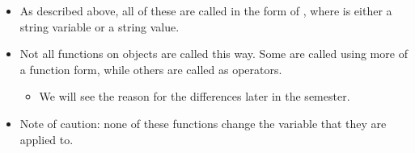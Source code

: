 \documentclass[letterpaper,10pt,english]{sphinxmanual}
\begin{document}
\begin{itemize}
\begin{sphinxVerbatim}[commandchars=\\\{\}]
\end{sphinxVerbatim}

\item {} 
As described above, all of these are called in the form of
, where  is either a string
variable or a string value.

\item {} 
Not all functions on objects are called this way. Some are called
using more of a function form, while others are called as
operators.

%
\begin{sphinxVerbatim}[commandchars=\\\{\}]
  
  
\end{sphinxVerbatim}
\begin{itemize}
\item {} 
We will see the reason for the differences later in the semester.

\end{itemize}

\item {} 
Note of caution:  none of these functions change the variable that they
are applied to.

\end{itemize}
\end{document}
